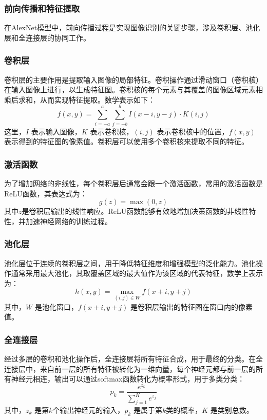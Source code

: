 \documentclass[a4paper,12pt]{article}
\begin{document}
\subsubsection{前向传播和特征提取}
在AlexNet模型中，前向传播过程是实现图像识别的关键步骤，涉及卷积层、池化层和全连接层的协同工作。

\subsubsection*{卷积层}
卷积层的主要作用是提取输入图像的局部特征。卷积操作通过滑动窗口（卷积核）在输入图像上进行，以生成特征图。卷积核的每个元素与其覆盖的图像区域元素相乘后求和，从而实现特征提取。数学表示如下：
\begin{equation}
	f(x, y) = \sum_{i=-a}^{a} \sum_{j=-b}^{b} I(x-i, y-j) \cdot K(i, j)
\end{equation}
这里，$I$ 表示输入图像，$K$ 表示卷积核，$(i, j)$ 表示卷积核中的位置，$f(x, y)$ 表示得到的特征图的像素值。卷积层可以使用多个卷积核来提取不同的特征。

\subsubsection*{激活函数}
为了增加网络的非线性，每个卷积层后通常会跟一个激活函数，常用的激活函数是ReLU函数，其表达式为：
\begin{equation}
	g(z) = \max(0, z)
\end{equation}
其中$z$是卷积层输出的线性响应。ReLU函数能够有效地增加决策函数的非线性特性，并加速神经网络的训练过程。

\subsubsection*{池化层}
池化层位于连续的卷积层之间，用于降低特征维度和增强模型的泛化能力。池化操作通常采用最大池化，其取覆盖区域的最大值作为该区域的代表特征，数学上表示为：
\begin{equation}
	h(x, y) = \max_{(i, j) \in W} f(x+i, y+j)
\end{equation}
其中，$W$ 是池化窗口，$f(x+i, y+j)$ 是卷积层输出的特征图在窗口内的像素值。

\subsubsection*{全连接层}
经过多层的卷积和池化操作后，全连接层将所有特征合成，用于最终的分类。在全连接层中，来自前一层的所有特征被转化为一维向量，每个神经元都与前一层的所有神经元相连，输出可以通过softmax函数转化为概率形式，用于多类分类：
\begin{equation}
	p_k = \frac{e^{z_k}}{\sum_{j=1}^K e^{z_j}}
\end{equation}
其中，$z_k$ 是第$k$个输出神经元的输入，$p_k$ 是属于第$k$类的概率，$K$ 是类别总数。
\end{document}
